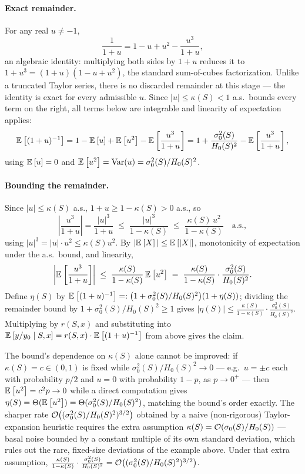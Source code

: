 \begin{pf}
\paragraph{Exact remainder.} For any real $u\neq-1$,
\[
    \frac{1}{1+u} = 1-u+u^2-\frac{u^3}{1+u},
\]
an algebraic identity: multiplying both sides by $1+u$ reduces it to $1+u^3=(1+u)(1-u+u^2)$, the standard sum-of-cubes factorization. Unlike a truncated Taylor series, there is no discarded remainder at this stage — the identity is exact for every admissible $u$. Since $|u|\le\kappa(S)<1$ a.s.\ bounds every term on the right, all terms below are integrable and linearity of expectation applies:
\[
    \mathbb{E}_{}\left[{(1+u)^{-1}}\right] = 1-\mathbb{E}_{}\left[{u}\right]+\mathbb{E}_{}\left[{u^2}\right]-\mathbb{E}_{}\left[{\frac{u^3}{1+u}}\right] = 1+\frac{\sigma_0^2(S)}{H_0(S)^2}-\mathbb{E}_{}\left[{\frac{u^3}{1+u}}\right],
\]
using $\mathbb{E}_{}\left[{u}\right]=0$ and $\mathbb{E}_{}\left[{u^2}\right]=\mathrm{Var}(u)=\sigma_0^2(S)/H_0(S)^2$.

\paragraph{Bounding the remainder.} Since $|u|\le\kappa(S)$ a.s., $1+u\ge1-\kappa(S)>0$ a.s., so
\[
    \left|\frac{u^3}{1+u}\right| = \frac{|u|^3}{1+u} \;\le\; \frac{|u|^3}{1-\kappa(S)} \;\le\; \frac{\kappa(S)\,u^2}{1-\kappa(S)} \quad\text{a.s.},
\]
using $|u|^3=|u|\cdot u^2\le\kappa(S)u^2$. By $|\mathbb{E}_{}\left[{X}\right]|\le\mathbb{E}_{}\left[{|X|}\right]$, monotonicity of expectation under the a.s.\ bound, and linearity,
\[
    \left|\mathbb{E}_{}\left[{\frac{u^3}{1+u}}\right]\right| \;\le\; \frac{\kappa(S)}{1-\kappa(S)}\,\mathbb{E}_{}\left[{u^2}\right] \;=\; \frac{\kappa(S)}{1-\kappa(S)}\cdot\frac{\sigma_0^2(S)}{H_0(S)^2}.
\]
Define $\eta(S)$ by $\mathbb{E}_{}\left[{(1+u)^{-1}}\right]=:\big(1+\sigma_0^2(S)/H_0(S)^2\big)(1+\eta(S))$; dividing the remainder bound by $1+\sigma_0^2(S)/H_0(S)^2\ge1$ gives $|\eta(S)|\le\frac{\kappa(S)}{1-\kappa(S)}\cdot\frac{\sigma_0^2(S)}{H_0(S)^2}$. Multiplying by $r(S,x)$ and substituting into $\mathbb{E}_{}\left[{y/y_0\mid S,x}\right]=r(S,x)\cdot\mathbb{E}_{}\left[{(1+u)^{-1}}\right]$ from above gives the claim.
\end{pf}

\begin{rmk}
The bound's dependence on $\kappa(S)$ alone cannot be improved: if $\kappa(S)=c\in(0,1)$ is fixed while $\sigma_0^2(S)/H_0(S)^2\to0$ — e.g.\ $u=\pm c$ each with probability $p/2$ and $u=0$ with probability $1-p$, as $p\to0^+$ — then $\mathbb{E}_{}\left[{u^2}\right]=c^2p\to0$ while a direct computation gives $\eta(S)=\Theta(\mathbb{E}_{}\left[{u^2}\right])=\Theta(\sigma_0^2(S)/H_0(S)^2)$, matching the bound's order exactly. The sharper rate $\mathcal{O}\big((\sigma_0^2(S)/H_0(S)^2)^{3/2}\big)$ obtained by a naive (non-rigorous) Taylor-expansion heuristic requires the extra assumption $\kappa(S)=\mathcal{O}(\sigma_0(S)/H_0(S))$ — basal noise bounded by a constant multiple of its own standard deviation, which rules out the rare, fixed-size deviations of the example above. Under that extra assumption, $\frac{\kappa(S)}{1-\kappa(S)}\cdot\frac{\sigma_0^2(S)}{H_0(S)^2}=\mathcal{O}\big((\sigma_0^2(S)/H_0(S)^2)^{3/2}\big)$.
\end{rmk}
